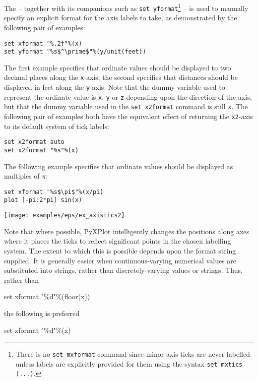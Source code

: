 The  -- together with its companions such as {\tt set
yformat}\footnote{There is no {\tt set mxformat} command since minor axis ticks
are never labelled unless labels are explicitly provided for them using the
syntax {\tt set mxtics (...)}.} -- is used to manually specify an explicit
format for the axis labels to take, as demonstrated by the following pair of
examples:
\begin{verbatim}
set xformat "%.2f"%(x)
set yformat "%s$^\prime$"%(y/unit(feet))
\end{verbatim}
The first example specifies that ordinate values should be displayed to two
decimal places along the {\tt x}-axis; the second specifies that distances should
be displayed in feet along the {\tt y}-axis. Note that the dummy variable used to
represent the ordinate value is {\tt x}, {\tt y} or {\tt z} depending upon the
direction of the axis, but that the dummy variable used in the {\tt set
x2format} command is still {\tt x}. The following pair of examples both have
the equivalent effect of returning the {\tt x2}-axis to its default system of
tick labels:
\begin{verbatim}
set x2format auto
set x2format "%s"%(x)
\end{verbatim}

The following example specifies that ordinate values should be displayed as
multiples of $\pi$:
\begin{verbatim}
set xformat "%s$\pi$"%(x/pi)
plot [-pi:2*pi] sin(x)
\end{verbatim}

\noindent\centerline{\texttt{[image: examples/eps/ex\_axistics2]}}

Note that where possible, PyXPlot intelligently changes the positions along
axes where it places the ticks to reflect significant points in the chosen
labelling system.  The extent to which this is possible depends upon the format
string supplied. It is generally easier when continuous-varying numerical
values are substituted into strings, rather than discretely-varying values or
strings. Thus, rather than

\begin{dontdo}
set xformat "\%d"\%(floor(x))
\end{dontdo}

\noindent the following is preferred

\begin{dodo}
set xformat "\%d"\%(x)
\end{dodo}


